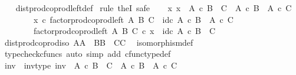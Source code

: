 \begin{isabellebody}
%
\isadelimproof
\ \ %
\endisadelimproof
%
\isatagproof
{}\isamarkupfalse%
\ dist{\isacharunderscore}{\kern0pt}prod{\isacharunderscore}{\kern0pt}coprod{\isacharunderscore}{\kern0pt}left{\isacharunderscore}{\kern0pt}def\isanewline
{}\isamarkupfalse%
\ {\isacharparenleft}{\kern0pt}rule\ theI{\isacharprime}{\kern0pt}{\isacharcomma}{\kern0pt}\ safe{\isacharparenright}{\kern0pt}\isanewline
\ \ \isamarkupfalse%
\ {\isachardoublequoteopen}{\isasymexists}x{\isachardot}{\kern0pt}\ x\ {\isacharcolon}{\kern0pt}\ A\ {\isasymtimes}\isactrlsub c\ B\ {\isasymCoprod}\ C\ {\isasymrightarrow}\ {\isacharparenleft}{\kern0pt}A\ {\isasymtimes}\isactrlsub c\ B{\isacharparenright}{\kern0pt}\ {\isasymCoprod}\ A\ {\isasymtimes}\isactrlsub c\ C\ {\isasymand}\isanewline
\ \ \ \ \ \ \ \ x\ {\isasymcirc}\isactrlsub c\ factor{\isacharunderscore}{\kern0pt}prod{\isacharunderscore}{\kern0pt}coprod{\isacharunderscore}{\kern0pt}left\ A\ B\ C\ {\isacharequal}{\kern0pt}\ id\isactrlsub c\ {\isacharparenleft}{\kern0pt}{\isacharparenleft}{\kern0pt}A\ {\isasymtimes}\isactrlsub c\ B{\isacharparenright}{\kern0pt}\ {\isasymCoprod}\ A\ {\isasymtimes}\isactrlsub c\ C{\isacharparenright}{\kern0pt}\ {\isasymand}\isanewline
\ \ \ \ \ \ \ \ factor{\isacharunderscore}{\kern0pt}prod{\isacharunderscore}{\kern0pt}coprod{\isacharunderscore}{\kern0pt}left\ A\ B\ C\ {\isasymcirc}\isactrlsub c\ x\ {\isacharequal}{\kern0pt}\ id\isactrlsub c\ {\isacharparenleft}{\kern0pt}A\ {\isasymtimes}\isactrlsub c\ B\ {\isasymCoprod}\ C{\isacharparenright}{\kern0pt}{\isachardoublequoteclose}\isanewline
\ \ \ \ \isamarkupfalse%
\ dist{\isacharunderscore}{\kern0pt}prod{\isacharunderscore}{\kern0pt}coprod{\isacharunderscore}{\kern0pt}iso{\isacharbrackleft}{\kern0pt}\ A{\isacharequal}{\kern0pt}A{\isacharcomma}{\kern0pt}\ \ B{\isacharequal}{\kern0pt}B{\isacharcomma}{\kern0pt}\ \ C{\isacharequal}{\kern0pt}C{\isacharbrackright}{\kern0pt}\ \isamarkupfalse%
\ isomorphism{\isacharunderscore}{\kern0pt}def\isanewline
\ \ \ \ \isamarkupfalse%
\ {\isacharparenleft}{\kern0pt}typecheck{\isacharunderscore}{\kern0pt}cfuncs{\isacharcomma}{\kern0pt}\ auto\ simp\ add{\isacharcolon}{\kern0pt}\ cfunc{\isacharunderscore}{\kern0pt}type{\isacharunderscore}{\kern0pt}def{\isacharparenright}{\kern0pt}\isanewline
\ \ \isamarkupfalse%
\ \isamarkupfalse%
\ inv\ \ inv{\isacharunderscore}{\kern0pt}type{\isacharcolon}{\kern0pt}\ {\isachardoublequoteopen}inv\ {\isacharcolon}{\kern0pt}\ A\ {\isasymtimes}\isactrlsub c\ B\ {\isasymCoprod}\ C\ {\isasymrightarrow}\ {\isacharparenleft}{\kern0pt}A\ {\isasymtimes}\isactrlsub c\ B{\isacharparenright}{\kern0pt}\ {\isasymCoprod}\ A\ {\isasymtimes}\isactrlsub c\ C{\isachardoublequoteclose}\ \isanewline

\end{isabellebody}
